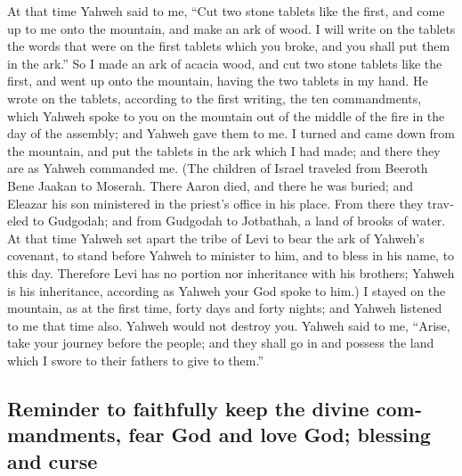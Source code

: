\begin{paracol}{2}
\begin{otherlanguage}{english}
 At that time Yahweh said to me, ``Cut two stone tablets
like the first, and come up to me onto the mountain, and make an ark of
wood.  I will write on the tablets the words that were on
the first tablets which you broke, and you shall put them in the ark.''
 So I made an ark of acacia wood, and cut two stone
tablets like the first, and went up onto the mountain, having the two
tablets in my hand.  He wrote on the tablets, according to
the first writing, the ten commandments, which Yahweh spoke to you on
the mountain out of the middle of the fire in the day of the assembly;
and Yahweh gave them to me.  I turned and came down from
the mountain, and put the tablets in the ark which I had made; and there
they are as Yahweh commanded me.  (The children of Israel
traveled from Beeroth Bene Jaakan to Moserah. There Aaron died, and
there he was buried; and Eleazar his son ministered in the priest's
office in his place.  From there they traveled to
Gudgodah; and from Gudgodah to Jotbathah, a land of brooks of water.
 At that time Yahweh set apart the tribe of Levi to bear
the ark of Yahweh's covenant, to stand before Yahweh to minister to him,
and to bless in his name, to this day.  Therefore Levi has
no portion nor inheritance with his brothers; Yahweh is his inheritance,
according as Yahweh your God spoke to him.)  I stayed on
the mountain, as at the first time, forty days and forty nights; and
Yahweh listened to me that time also. Yahweh would not destroy you.
 Yahweh said to me, ``Arise, take your journey before the
people; and they shall go in and possess the land which I swore to their
fathers to give to them.''

\hypertarget{reminder-to-faithfully-keep-the-divine-commandments-fear-god-and-love-god-blessing-and-curse}{%
\subsection{Reminder to faithfully keep the divine commandments, fear
God and love God; blessing and
curse}\label{reminder-to-faithfully-keep-the-divine-commandments-fear-god-and-love-god-blessing-and-curse}}


\end{otherlanguage}
\end{paracol}

